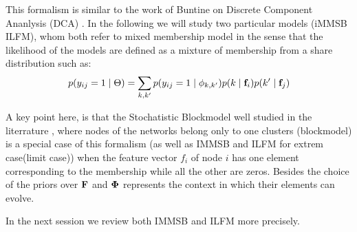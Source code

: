 This formalism is similar to the work of Buntine on Discrete Component Ananlysis (DCA) \cite{DCA}. In the following we will study two particular models (iMMSB ILFM), whom both refer to mixed membership model in the sense that the likelihood of the models are defined as a mixture of membership from a share distribution such as:
\begin{equation}
p(y_{ij}=1 \mid \Theta ) = \sum_{k, k'} p(y_{ij}=1\mid\phi_{k,k'}) p(k \mid \mathbf{f}_i) p(k' \mid \mathbf{f}_j)
\end{equation}

A key point here, is that the Stochatistic Blockmodel well studied in the literrature \cite{goldenberg2010survey}, where nodes of the networks belong only to one clusters (blockmodel) is a special case of this formalism (as well as IMMSB and ILFM for extrem case(limit case)) when the feature vector $f_i$ of node $i$ has one element corresponding to the membership while all the other are zeros. Besides the choice of the priors over $\mathbf{F}$ and $\mathbf{\Phi}$ represents the context in which  their elements can evolve.

In the next session we review both IMMSB and ILFM more precisely.

